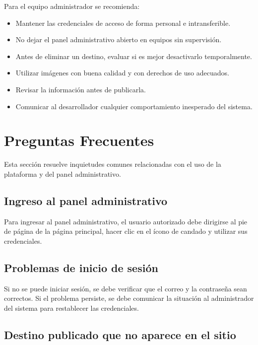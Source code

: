 \documentclass[12pt,letterpaper]{article}
\begin{document}
Para el equipo administrador se recomienda:

\begin{itemize}
    \item Mantener las credenciales de acceso de forma personal e intransferible.
    \item No dejar el panel administrativo abierto en equipos sin supervisión.
    \item Antes de eliminar un destino, evaluar si es mejor desactivarlo temporalmente.
    \item Utilizar imágenes con buena calidad y con derechos de uso adecuados.
    \item Revisar la información antes de publicarla.
    \item Comunicar al desarrollador cualquier comportamiento inesperado del sistema.
\end{itemize}

\section{Preguntas Frecuentes}

Esta sección resuelve inquietudes comunes relacionadas con el uso de la plataforma y del panel administrativo.

\subsection*{Ingreso al panel administrativo}

Para ingresar al panel administrativo, el usuario autorizado debe dirigirse al pie de página de la página principal, hacer clic en el ícono de candado y utilizar sus credenciales.

\subsection*{Problemas de inicio de sesión}

Si no se puede iniciar sesión, se debe verificar que el correo y la contraseña sean correctos. Si el problema persiste, se debe comunicar la situación al administrador del sistema para restablecer las credenciales.

\subsection*{Destino publicado que no aparece en el sitio}
\end{document}
